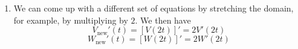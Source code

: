 \begin{enumerate}
\begin{enumerate}
				\item We can come up with a different set of equations by stretching the domain, for example, by multiplying by $2$.
				We then have
				\[
					V_{\text{new}}'(t) = [V(2t)]'=2V'(2t)
				\]
				\[
					W_{\text{new}}'(t) = [W(2t)]'=2W'(2t)
				\]
			\end{enumerate}
			






\end{enumerate}
